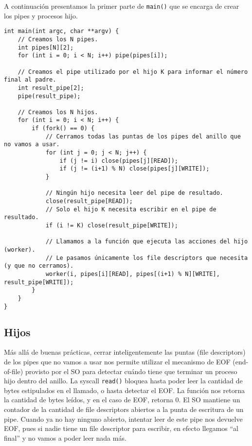

A continuación presentamos la primer parte de \texttt{main()} que se encarga de crear los pipes y procesos hijo.


\begin{verbatim}
int main(int argc, char **argv) {
    // Creamos los N pipes.
    int pipes[N][2];
    for (int i = 0; i < N; i++) pipe(pipes[i]);

    // Creamos el pipe utilizado por el hijo K para informar el número final al padre.
    int result_pipe[2];
    pipe(result_pipe);

    // Creamos los N hijos.
    for (int i = 0; i < N; i++) {
        if (fork() == 0) {
            // Cerramos todas las puntas de los pipes del anillo que no vamos a usar.
            for (int j = 0; j < N; j++) {
                if (j != i) close(pipes[j][READ]);
                if (j != (i+1) % N) close(pipes[j][WRITE]);
            }

            // Ningún hijo necesita leer del pipe de resultado.
            close(result_pipe[READ]);
            // Solo el hijo K necesita escribir en el pipe de resultado.
            if (i != K) close(result_pipe[WRITE]);

            // Llamamos a la función que ejecuta las acciones del hijo (worker).
            // Le pasamos únicamente los file descriptors que necesita (y que no cerramos).
            worker(i, pipes[i][READ], pipes[(i+1) % N][WRITE], result_pipe[WRITE]);
        }
    }
}
\end{verbatim}

\subsection*{Hijos}

Más allá de buenas prácticas, cerrar inteligentemente las puntas (file descriptors) de los pipes que no vamos a usar nos permite utilizar el mecanismo de EOF (end-of-file) provisto por el SO para detectar cuándo tiene que terminar un proceso hijo dentro del anillo. La syscall \texttt{read()} bloquea hasta poder leer la cantidad de bytes estipulados en el llamado, o hasta detectar el EOF. La función nos retorna la cantidad de bytes leídos, y en el caso de EOF, retorna 0. El SO mantiene un contador de la cantidad de file descriptors abiertos a la punta de escritura de un pipe. Cuando ya no hay ninguno abierto, intentar leer de este pipe nos devuelve EOF, pues si nadie tiene un file descriptor para escribir, en efecto llegamos ``al final'' y no vamos a poder leer nada más.

